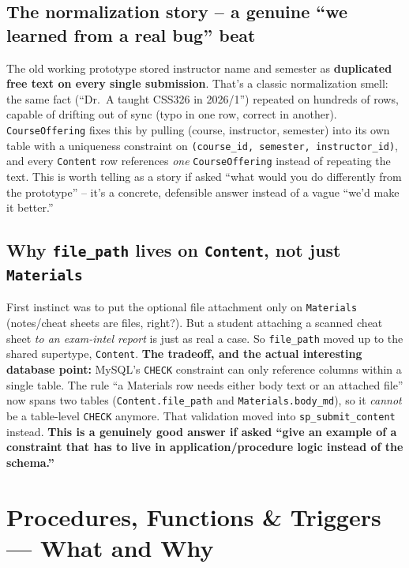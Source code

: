 \documentclass[11pt]{article}
\begin{document}
\subsection{The normalization story -- a genuine ``we learned from a real bug'' beat}
The old working prototype stored instructor name and semester as \textbf{duplicated free text on every single submission}. That's a classic normalization smell: the same fact (``Dr.\ A taught CSS326 in 2026/1'') repeated on hundreds of rows, capable of drifting out of sync (typo in one row, correct in another). \texttt{CourseOffering} fixes this by pulling (course, instructor, semester) into its own table with a uniqueness constraint on \texttt{(course\_id, semester, instructor\_id)}, and every \texttt{Content} row references \emph{one} \texttt{CourseOffering} instead of repeating the text. This is worth telling as a story if asked ``what would you do differently from the prototype'' -- it's a concrete, defensible answer instead of a vague ``we'd make it better.''

\subsection{Why \texttt{file\_path} lives on \texttt{Content}, not just \texttt{Materials}}
First instinct was to put the optional file attachment only on \texttt{Materials} (notes/cheat sheets are files, right?). But a student attaching a scanned cheat sheet \emph{to an exam-intel report} is just as real a case. So \texttt{file\_path} moved up to the shared supertype, \texttt{Content}. \textbf{The tradeoff, and the actual interesting database point:} MySQL's \texttt{CHECK} constraint can only reference columns within a single table. The rule ``a Materials row needs either body text or an attached file'' now spans two tables (\texttt{Content.file\_path} and \texttt{Materials.body\_md}), so it \emph{cannot} be a table-level \texttt{CHECK} anymore. That validation moved into \texttt{sp\_submit\_content} instead. \textbf{This is a genuinely good answer if asked ``give an example of a constraint that has to live in application/procedure logic instead of the schema.''}

\section{Procedures, Functions \& Triggers --- What and Why}
\end{document}

